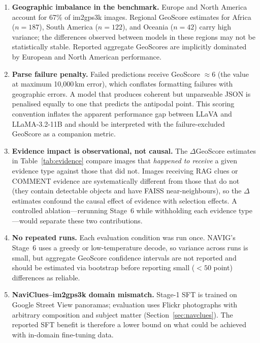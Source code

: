 \documentclass[11pt]{article}
\begin{document}
\begin{enumerate}[noitemsep]
  \item \textbf{Geographic imbalance in the benchmark.} Europe and North America account
    for 67\% of im2gps3k images. Regional GeoScore estimates for Africa ($n = 187$),
    South America ($n = 122$), and Oceania ($n = 42$) carry high variance; the
    differences observed between models in these regions may not be statistically
    stable. Reported aggregate GeoScores are implicitly dominated by European and North
    American performance.

  \item \textbf{Parse failure penalty.} Failed predictions receive GeoScore $\approx 6$
    (the value at maximum 10{,}000\,km error), which conflates formatting failures with
    geographic errors. A model that produces coherent but unparseable JSON is penalised
    equally to one that predicts the antipodal point. This scoring convention inflates
    the apparent performance gap between LLaVA and LLaMA-3.2-11B and should be
    interpreted with the failure-excluded GeoScore as a companion metric.

  \item \textbf{Evidence impact is observational, not causal.} The $\Delta$GeoScore
    estimates in Table~\ref{tab:evidence} compare images that \emph{happened to receive}
    a given evidence type against those that did not. Images receiving RAG clues or COMMENT
    evidence are systematically different from those that do not (they contain detectable
    objects and have FAISS near-neighbours), so the $\Delta$ estimates confound the causal
    effect of evidence with selection effects. A controlled ablation---rerunning Stage~6
    while withholding each evidence type---would separate these two contributions.

  \item \textbf{No repeated runs.} Each evaluation condition was run once. NAVIG's Stage~6
    uses a greedy or low-temperature decode, so variance across runs is small, but aggregate
    GeoScore confidence intervals are not reported and should be estimated via bootstrap
    before reporting small ($< 50$ point) differences as reliable.

  \item \textbf{NaviClues--im2gps3k domain mismatch.} Stage-1 SFT is trained on Google
    Street View panoramas; evaluation uses Flickr photographs with arbitrary composition
    and subject matter (Section~\ref{sec:navclues}). The reported SFT benefit is therefore
    a lower bound on what could be achieved with in-domain fine-tuning data.
\end{enumerate}
\end{document}
